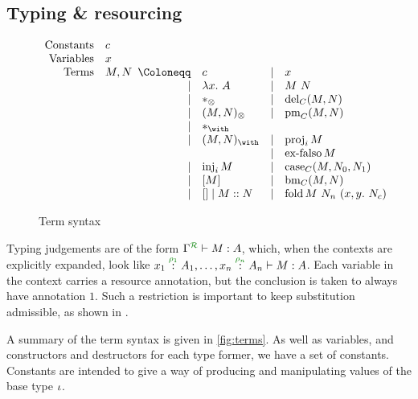 \subsection{Typing \& resourcing}
\label{sec:rules}

\begin{figure}
  \begin{displaymath}
    \begin{array}{rl}
      \textrm{Constants} & c \\
      \textrm{Variables} & x \\
      \textrm{Terms} & M, N
                       \begin{array}[t]{rlcl}
                         \Coloneqq & c & \mid & x \\
                         \mid & \lam{x}{A} & \mid & \app{M}{N} \\
                         \mid & \unit & \mid & \del{C}{M}{N} \\
                         \mid & \ten{M}{N} & \mid & \prm{C}{M}{x}{y}{N} \\
                         \mid & \eat & & \\
                         \mid & \wth{M}{N} & \mid & \proj{i}{M} \\
                                   & & \mid & \exf{C}{M} \\ 
                         \mid & \inj{i}{M} & \mid & \cse{C}{M}{x}{N_0}{y}{N_1} \\
                         \mid & \bang{M} & \mid & \bm{C}{M}{x}{N} \\
                         \mid & \nil \mid \cons{M}{N} & \mid & \fold{M}{N_n}{x}{y}{N_c}
                       \end{array}
    \end{array}
  \end{displaymath}
  \caption{Term syntax}
  \label{fig:terms}
\end{figure}

Typing judgements are of the form $\ctx{\Gamma}{R} \vdash M : A$, which, when
the contexts are explicitly expanded, look like
$\ctxvar{x_1}{A_1}{\rho_1}, \ldots, \ctxvar{x_n}{A_n}{\rho_n} \vdash M : A$.
Each variable in the context carries a resource annotation, but the conclusion
is taken to always have annotation $1$.
Such a restriction is important to keep substitution admissible, as shown in
\cite{quantitative-type-theory}. 

A summary of the term syntax is given in \autoref{fig:terms}.
As well as variables, and constructors and destructors for each type former, we
have a set of constants.
Constants are intended to give a way of producing and manipulating values of the
base type $\iota$.

